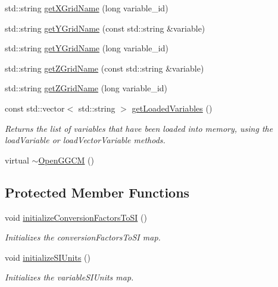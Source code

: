 \begin{DoxyCompactItemize}
\item 
std\-::string \hyperlink{classccmc_1_1_open_g_g_c_m_a9bbdc812d31153bf7529d7474a674390}{get\-X\-Grid\-Name} (long variable\-\_\-id)
\item 
std\-::string \hyperlink{classccmc_1_1_open_g_g_c_m_ae1ee82c1dccdedd15c4370895c1377e4}{get\-Y\-Grid\-Name} (const std\-::string \&variable)
\item 
std\-::string \hyperlink{classccmc_1_1_open_g_g_c_m_a96ac6043396dc00aea33d3b05cb7b29d}{get\-Y\-Grid\-Name} (long variable\-\_\-id)
\item 
std\-::string \hyperlink{classccmc_1_1_open_g_g_c_m_ab07efc9a18a869a4590c1eb3306a7f64}{get\-Z\-Grid\-Name} (const std\-::string \&variable)
\item 
std\-::string \hyperlink{classccmc_1_1_open_g_g_c_m_ae4810a6b0365259fff330e056ce92fb6}{get\-Z\-Grid\-Name} (long variable\-\_\-id)
\item 
const std\-::vector$<$ std\-::string $>$ \hyperlink{classccmc_1_1_open_g_g_c_m_a6839ad216b98e0050808abd0c08ed868}{get\-Loaded\-Variables} ()
\begin{DoxyCompactList}\small\item\em Returns the list of variables that have been loaded into memory, using the load\-Variable or load\-Vector\-Variable methods. \end{DoxyCompactList}\item 
virtual \hyperlink{classccmc_1_1_open_g_g_c_m_a840e4170a8d7dc3794bda848021168a4}{$\sim$\-Open\-G\-G\-C\-M} ()
\end{DoxyCompactItemize}
\subsection*{Protected Member Functions}
\begin{DoxyCompactItemize}
\item 
void \hyperlink{classccmc_1_1_open_g_g_c_m_ad0eab5a6039fba2eb809a3f7ab555676}{initialize\-Conversion\-Factors\-To\-S\-I} ()
\begin{DoxyCompactList}\small\item\em Initializes the conversion\-Factors\-To\-S\-I map.  \end{DoxyCompactList}\item 
void \hyperlink{classccmc_1_1_open_g_g_c_m_a70edfe6a76c0f2e72ae47cae5f7e35ae}{initialize\-S\-I\-Units} ()
\begin{DoxyCompactList}\small\item\em Initializes the variable\-S\-I\-Units map.  \end{DoxyCompactList}\end{DoxyCompactItemize}
